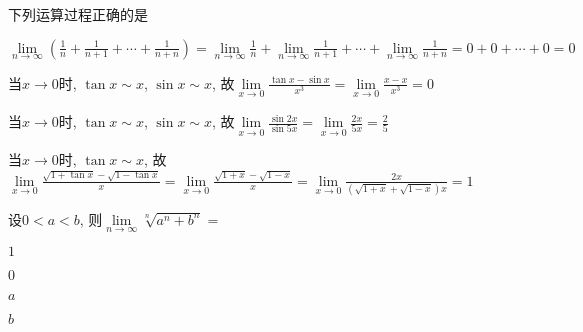 \begin{problem}
	下列运算过程正确的是
	
	\begin{abcd} 
		\item
		$\displaystyle \lim\limits_{n \rightarrow \infty}(\frac{1}{n} + \frac{1}{n + 1} + \cdots + \frac{1}{n + n}) = \lim\limits_{n \rightarrow \infty}\frac{1}{n} + \lim\limits_{n \rightarrow \infty}\frac{1}{n + 1} + \cdots + \lim\limits_{n \rightarrow \infty}\frac{1}{n + n} = 0 + 0 + \cdots + 0 = 0$
		
		\item
		当$\displaystyle x \rightarrow 0$时, $\displaystyle \tan x\sim x$, $\sin x\sim x$, 故$\displaystyle \lim\limits_{x \rightarrow 0}\frac{\tan x - \sin x}{x^{3}} = \lim\limits_{x \rightarrow 0}\frac{x - x}{x^{3}} = 0$
		
		\item
		当$\displaystyle x \rightarrow 0$时, $\displaystyle \tan x\sim x$, $\sin x\sim x$, 故$\displaystyle \lim\limits_{x \rightarrow 0}\frac{\sin 2x}{\sin 5x} = \lim\limits_{x \rightarrow 0}\frac{2x}{5x} = \frac{2}{5}$
		
		\item
		当$x \rightarrow 0$时, $\tan x\sim x$, 故$\displaystyle \lim\limits_{x \rightarrow 0}\frac{\sqrt{1 + \tan x} - \sqrt{1 - \tan x}}{x} = \lim\limits_{x \rightarrow 0}\frac{\sqrt{1 + x} - \sqrt{1 - x}}{x} = \lim\limits_{x \rightarrow 0}\frac{2x}{(\sqrt{1 + x} + \sqrt{1 - x})x} = 1$
		
	\end{abcd}
	
	
\end{problem} 


\begin{problem}
	设$0 < a < b$, 则$\lim\limits_{n \rightarrow \infty}\sqrt[n]{a^{n} + b^{n}} =$
	
	\begin{abcd} 
		\item $1$
		
		\item $0$
		
		\item $a$
		
		\item $b$
		\end{abcd}
		
		
	\end{problem} 

